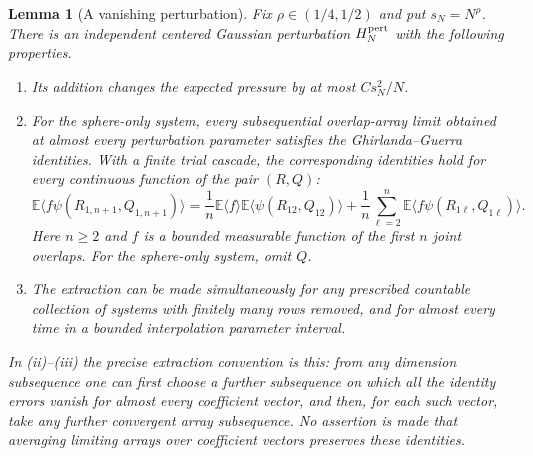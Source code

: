 \documentclass[11pt,a4paper]{article}
\numberwithin{equation}{section}
\newtheorem{lemma}[theorem]{Lemma}
\theoremstyle{definition}
\theoremstyle{remark}
\newcommand{\E}{\mathbb E}
\begin{document}
\begin{lemma}[A vanishing perturbation]\label{lem:press-gg}
Fix $\rho\in(1/4,1/2)$ and put $s_N=N^\rho$. There is an independent centered
Gaussian perturbation $H_N^{\rm pert}$ with the following properties.
\begin{enumerate}[label=(\roman*)]
\item Its addition changes the expected pressure by at most $Cs_N^2/N$.
\item For the sphere-only system, every subsequential overlap-array limit
obtained at almost every perturbation parameter satisfies the
Ghirlanda--Guerra identities. With a finite trial cascade, the corresponding
identities hold for every continuous function of the pair $(R,Q)$:
\begin{equation}\label{eq:press-joint-gg}
 \E\langle f\psi(R_{1,n+1},Q_{1,n+1})\rangle
 =\frac1n\E\langle f\rangle\E\langle\psi(R_{12},Q_{12})\rangle
  +\frac1n\sum_{\ell=2}^n
   \E\langle f\psi(R_{1\ell},Q_{1\ell})\rangle.
\end{equation}
Here $n\ge2$ and $f$ is a bounded measurable function of the first $n$ joint
overlaps. For the sphere-only system, omit $Q$.
\item The extraction can be made simultaneously for any prescribed countable
collection of systems with finitely many rows removed, and for almost every
time in a bounded interpolation parameter interval.
\end{enumerate}
In (ii)--(iii) the precise extraction convention is this: from any dimension
subsequence one can first choose a further subsequence on which all the
identity errors vanish for almost every coefficient vector, and then, for
each such vector, take any further convergent array subsequence. No assertion
is made that averaging limiting arrays over coefficient vectors preserves
these identities.
\end{lemma}
\end{document}
